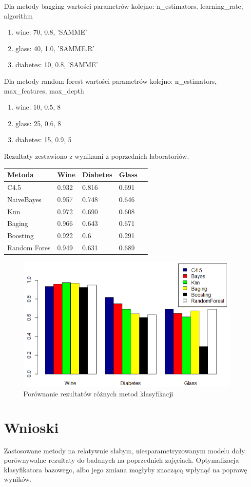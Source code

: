 \documentclass[12pt,a4paper]{article}
\begin{document}
Dla metody bagging wartości parametrów kolejno: n\_estimators, learning\_rate, algorithm

\begin{enumerate}
  \item wine: 70, 0.8, 'SAMME'
  \item glass: 40, 1.0, 'SAMME.R'
  \item diabetes: 10, 0.8, 'SAMME'
\end{enumerate}

Dla metody random forest wartości parametrów kolejno: n\_estimators, max\_features, max\_depth

\begin{enumerate}
  \item wine: 10, 0.5, 8
  \item glass: 25, 0.6, 8
  \item diabetes: 15, 0.9, 5
\end{enumerate}

Rezultaty zestawiono z wynikami z poprzednich laboratoriów.

\begin{tabular}{ |p{3cm}||p{2cm}|p{2cm}|p{2cm}|p{2cm}| }
\hline
Metoda & Wine & Diabetes & Glass \\
\hline
C4.5 & 0.932 & 0.816 & 0.691\\
NaiveBayes & 0.957 & 0.748 & 0.646\\
Knn & 0.972 & 0.690 & 0.608\\
Baging & 0.966 & 0.643 & 0.671\\
Boosting & 0.922 & 0.6 & 0.291\\
Random Fores & 0.949 & 0.631 & 0.689\\
\hline
\end{tabular}

\begin{figure}[H]
\centering
\includegraphics{versusGraphic.PNG}
\caption{Porównanie rezultatów różnych metod klasyfikacji}
\end{figure}

\section{Wnioski}
Zastosowane metody na relatywnie słabym, niesparametryzowanym modelu dały porównywalne rezultaty do badanych na poprzednich zajęciach. Optymalizacja klasyfikatora bazowego, albo jego zmiana mogłyby znaczącą wpłynąć na poprawę wyników.
\end{document}
